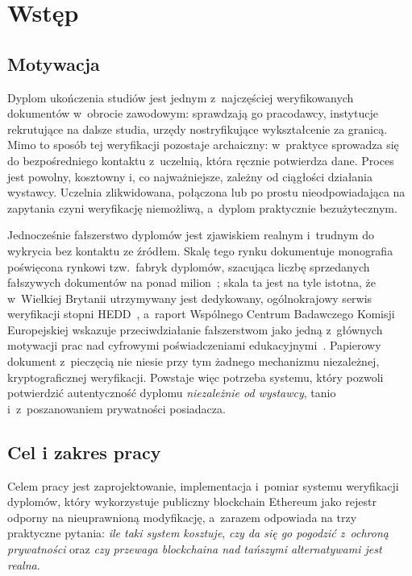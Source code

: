 \chapter{Wstęp}
\label{ch:wstep}

\section{Motywacja}
\label{sec:motywacja}

Dyplom ukończenia studiów jest jednym z~najczęściej weryfikowanych dokumentów
w~obrocie zawodowym: sprawdzają go pracodawcy, instytucje rekrutujące na dalsze
studia, urzędy nostryfikujące wykształcenie za granicą. Mimo to sposób tej
weryfikacji pozostaje archaiczny: w~praktyce sprowadza się do bezpośredniego
kontaktu z~uczelnią, która ręcznie potwierdza dane. Proces jest powolny, kosztowny
i, co najważniejsze, zależny od ciągłości działania wystawcy. Uczelnia
zlikwidowana, połączona lub po prostu nieodpowiadająca na zapytania czyni
weryfikację niemożliwą, a~dyplom praktycznie bezużytecznym.

Jednocześnie fałszerstwo dyplomów jest zjawiskiem realnym i~trudnym do wykrycia bez
kontaktu ze źródłem. Skalę tego rynku dokumentuje monografia poświęcona rynkowi
tzw.\ fabryk dyplomów, szacująca liczbę sprzedanych fałszywych dokumentów na ponad
milion~\cite{ezellbear2012}; skala ta jest na tyle istotna, że w~Wielkiej Brytanii
utrzymywany jest dedykowany, ogólnokrajowy serwis weryfikacji stopni
HEDD~\cite{hedd}, a~raport Wspólnego Centrum Badawczego Komisji Europejskiej
wskazuje przeciwdziałanie fałszerstwom jako jedną z~głównych motywacji prac nad
cyfrowymi poświadczeniami edukacyjnymi~\cite{grech2017}. Papierowy dokument
z~pieczęcią nie niesie przy tym żadnego mechanizmu niezależnej, kryptograficznej
weryfikacji. Powstaje więc potrzeba systemu, który pozwoli potwierdzić
autentyczność dyplomu \emph{niezależnie od wystawcy}, tanio i~z~poszanowaniem
prywatności posiadacza.

\section{Cel i zakres pracy}
\label{sec:cel}

Celem pracy jest zaprojektowanie, implementacja i~pomiar systemu weryfikacji
dyplomów, który wykorzystuje publiczny blockchain Ethereum jako rejestr odporny
na nieuprawnioną modyfikację, a~zarazem odpowiada na trzy praktyczne pytania:
\emph{ile taki system kosztuje}, \emph{czy da się go pogodzić z~ochroną prywatności}
oraz \emph{czy przewaga blockchaina nad tańszymi alternatywami jest realna}.

